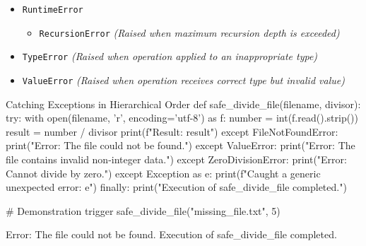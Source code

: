 \begin{itemize}[leftmargin=1.5em]
\begin{itemize}[leftmargin=1.5em]
\begin{itemize}[leftmargin=1.5em]
            \begin{itemize}[leftmargin=1.5em]
                \item \texttt{FileNotFoundError} \textit{(Raised when file or directory does not exist)}
                \item \texttt{PermissionError} \textit{(Raised when lacking adequate access rights)}
            \end{itemize}
            \item \texttt{RuntimeError}
            \begin{itemize}[leftmargin=1.5em]
                \item \texttt{RecursionError} \textit{(Raised when maximum recursion depth is exceeded)}
            \end{itemize}
            \item \texttt{TypeError} \textit{(Raised when operation applied to an inappropriate type)}
            \item \texttt{ValueError} \textit{(Raised when operation receives correct type but invalid value)}
        \end{itemize}
    \end{itemize}
\end{itemize}

\begin{pythoncode}[]{Catching Exceptions in Hierarchical Order}
def safe_divide_file(filename, divisor):
    try:
        with open(filename, 'r', encoding='utf-8') as f:
            number = int(f.read().strip())
            result = number / divisor
            print(f"Result: {result}")
    except FileNotFoundError:
        print("Error: The file could not be found.")
    except ValueError:
        print("Error: The file contains invalid non-integer data.")
    except ZeroDivisionError:
        print("Error: Cannot divide by zero.")
    except Exception as e:
        print(f"Caught a generic unexpected error: {e}")
    finally:
        print("Execution of safe_divide_file completed.")

# Demonstration trigger
safe_divide_file("missing_file.txt", 5)
\end{pythoncode}
\begin{outputbox}
Error: The file could not be found.
Execution of safe_divide_file completed.
\end{outputbox}

